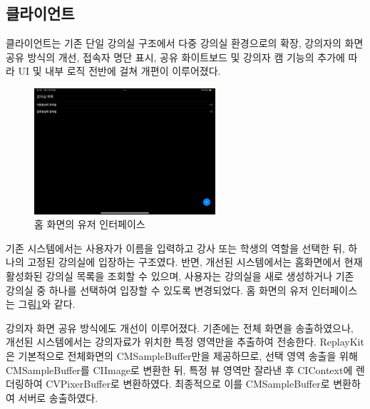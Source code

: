 \documentclass[10pt, a4paper, oneside]{article}
\begin{document}
\subsection{클라이언트}
클라이언트는 기존 단일 강의실 구조에서 다중 강의실 환경으로의 확장, 강의자의 화면 공유 방식의 개선, 접속자 명단 표시, 공유 화이트보드 및 강의자 캠 기능의 추가에 따라 UI 및 내부 로직 전반에 걸쳐 개편이 이루어졌다.
\newpage
\begin{figure}[htbp]
    \begin{center}
    \includegraphics[width=0.6\textwidth]{home.PNG}
    \caption{홈 화면의 유저 인터페이스}
    \label{fig:fig2}
    \end{center}
\end{figure}
기존 시스템에서는 사용자가 이름을 입력하고 강사 또는 학생의 역할을 선택한 뒤, 하나의 고정된 강의실에 입장하는 구조였다. 반면, 개선된 시스템에서는 홈화면에서 현재 활성화된 강의실 목록을 조회할 수 있으며, 사용자는 강의실을 새로 생성하거나 기존 강의실 중 하나를 선택하여 입장할 수 있도록 변경되었다. 홈 화면의 유저 인터페이스는 그림\ref{fig:fig2}와 같다.

강의자 화면 공유 방식에도 개선이 이루어졌다. 기존에는 전체 화면을 송출하였으나, 개선된 시스템에서는 강의자료가 위치한 특정 영역만을 추출하여 전송한다. ReplayKit\cite{ReplayKit}은 기본적으로 전체화면의 CMSampleBuffer만을 제공하므로, 선택 영역 송출을 위해 CMSampleBuffer를 CIImage로 변환한 뒤, 특정 뷰 영역만 잘라낸 후 CIContext에 렌더링하여 CVPixerBuffer로 변환하였다. 최종적으로 이를 CMSampleBuffer로 변환하여 서버로 송출하였다.
\end{document}

